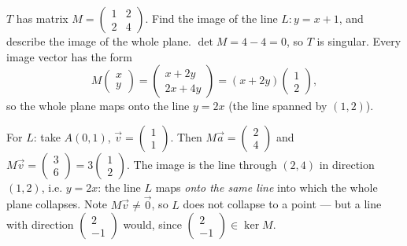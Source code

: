 \documentclass[11pt]{article}
\begin{document}
\begin{exoresolu}
$T$ has matrix $M = \begin{pmatrix} 1 & 2 \\ 2 & 4 \end{pmatrix}$. Find the image of the line $L: y = x + 1$, and describe the image of the whole plane.
\tcblower
$\det M = 4 - 4 = 0$, so $T$ is singular. Every image vector has the form
\[
M\begin{pmatrix} x \\ y \end{pmatrix} = \begin{pmatrix} x + 2y \\ 2x + 4y \end{pmatrix} = (x+2y)\begin{pmatrix} 1 \\ 2 \end{pmatrix},
\]
so the whole plane maps onto the line $y = 2x$ (the line spanned by $(1,2)$).

For $L$: take $A(0,1)$, $\vec{v} = \begin{pmatrix} 1 \\ 1 \end{pmatrix}$. Then $M\vec{a} = \begin{pmatrix} 2 \\ 4 \end{pmatrix}$ and $M\vec{v} = \begin{pmatrix} 3 \\ 6 \end{pmatrix} = 3\begin{pmatrix} 1 \\ 2 \end{pmatrix}$. The image is the line through $(2,4)$ in direction $(1,2)$, i.e. $y = 2x$: the line $L$ maps \emph{onto the same line} into which the whole plane collapses. Note $M\vec{v} \neq \vec{0}$, so $L$ does not collapse to a point — but a line with direction $\begin{pmatrix} 2 \\ -1 \end{pmatrix}$ would, since $\begin{pmatrix} 2 \\ -1 \end{pmatrix} \in \ker M$.
\end{exoresolu}
\end{document}
